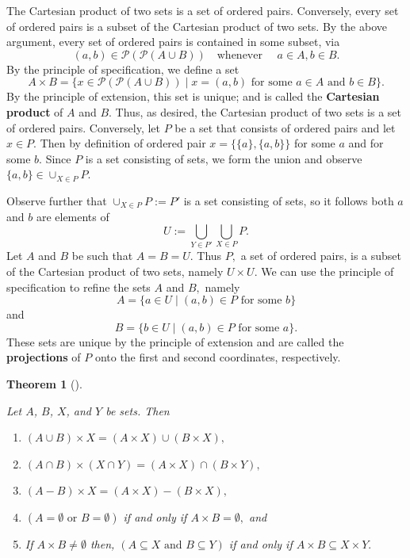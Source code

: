 \documentclass[
  letterpaper,
  10pt,
  reqno,
  twopage,
  openany]{book}
\providecommand{\tightlist}{%
  \setlength{\itemsep}{0pt}\setlength{\parskip}{0pt}}\usepackage{longtable,booktabs,array}
\theoremstyle{plain}
\theoremstyle{definition}
\theoremstyle{definition}
\theoremstyle{definition}
\theoremstyle{plain}
\theoremstyle{plain}
\newtheorem{theorem}{Theorem}[chapter]
\theoremstyle{remark}
\begin{document}
The Cartesian product of two sets is a set of ordered pairs. Conversely,
every set of ordered pairs is a subset of the Cartesian product of two
sets. By the above argument, every set of ordered pairs is contained in
some subset, via \[
(a,b)\in  \mathcal{P}(\mathcal{P}(A\cup B)) \quad \text{whenever } \quad a\in A, b\in B.
\] By the principle of specification, we define a set \[
A\times B = \{x \in \mathcal{P}(\mathcal{P}(A\cup B)) \mid x=(a,b) \text{ for some $a\in A$ and $b\in B$}\}.
\] By the principle of extension, this set is unique; and is called the
 \textbf{Cartesian product} of \(A\) and \(B.\)
Thus, as desired, the Cartesian product of two sets is a set of ordered
pairs. Conversely, let \(P\) be a set that consists of ordered pairs and
let \(x\in P.\) Then by definition of ordered pair
\(x=\{\{a\},\{a,b\}\}\) for some \(a\) and for some \(b.\) Since \(P\)
is a set consisting of sets, we form the union and observe
\(\{a,b\}\in \cup_{X\in P} P.\)

Observe further that \({\cup_{X\in P} P:=P'}\) is a set consisting of
sets, so it follows both \(a\) and \(b\) are elements of \[
U:=\bigcup_{Y\in P'} \bigcup_{X\in P} P.
\] Let \(A\) and \(B\) be such that \(A=B=U.\) Thus \(P,\) a set of
ordered pairs, is a subset of the Cartesian product of two sets, namely
\(U\times U.\) We can use the principle of specification to refine the
sets \(A\) and \(B,\) namely \[
A=\{ a \in U \mid (a,b) \in P \text{ for some } b \} 
\] and \[
B=\{ b \in U \mid (a,b) \in P \text{ for some } a \}.
\] These sets are unique by the principle of extension and are called
the  \textbf{projections} of \(P\) onto the first and
second coordinates, respectively.

\leavevmode{}%
\begin{theorem}[]\label{thm-projections}

Let \(A\), \(B\), \(X\), and \(Y\) be sets. Then

\begin{enumerate}
\def\labelenumi{\arabic{enumi}.}
\tightlist
\item
  \((A \cup B)\times X=(A\times X)\cup (B\times X),\)
\item
  \((A \cap B)\times (X\cap Y)=(A\times X)\cap (B\times Y),\)
\item
  \((A-B)\times X=(A\times X)-(B\times X),\)
\item
  \(\left( A=\emptyset \text{ or } B=\emptyset \right)\) if and only if
  \(A\times B=\emptyset,\) and
\item
  If \(A\times B\neq \emptyset\) then,
  \(\left( A\subseteq X \text{ and } B\subseteq Y \right)\) if and only
  if \(A\times B \subseteq X\times Y.\)
\end{enumerate}

\end{theorem}
\end{document}
